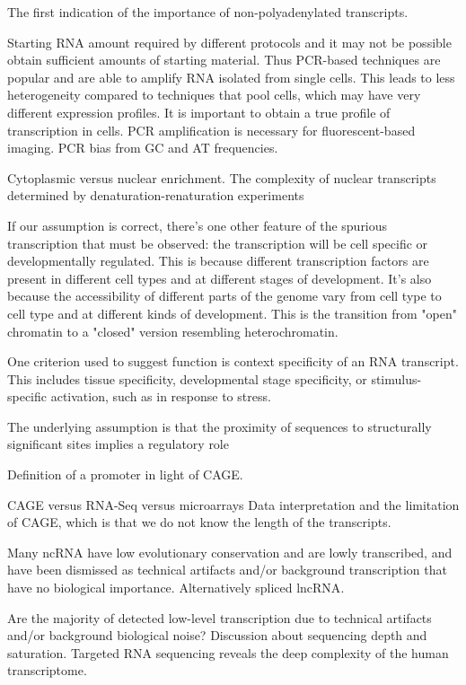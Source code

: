 The first indication of the importance of non-polyadenylated transcripts\cite{pmid4213457}.

Starting RNA amount required by different protocols and it may not be possible obtain sufficient amounts of starting material. Thus PCR-based techniques are popular and are able to amplify RNA isolated from single cells. This leads to less heterogeneity compared to techniques that pool cells, which may have very different expression profiles. It is important to obtain a true profile of transcription in cells. PCR amplification is necessary for fluorescent-based imaging. PCR bias from GC and AT frequencies.

Cytoplasmic versus nuclear enrichment. The complexity of nuclear transcripts determined by denaturation-renaturation experiments\cite{pmid5969070}

If our assumption is correct, there's one other feature of the spurious transcription that must be observed: the transcription will be cell specific or developmentally regulated. This is because different transcription factors are present in different cell types and at different stages of development. It's also because the accessibility of different parts of the genome vary from cell type to cell type and at different kinds of development. This is the transition from "open" chromatin to a "closed" version resembling heterochromatin.

One criterion used to suggest function is context specificity of an RNA transcript. This includes tissue specificity, developmental stage specificity, or stimulus-specific activation, such as in response to stress.

The underlying assumption is that the proximity of sequences to structurally significant sites implies a regulatory role

Definition of a promoter in light of CAGE.

CAGE versus RNA-Seq versus microarrays\cite{pmid24676093} Data interpretation and the limitation of CAGE, which is that we do not know the length of the transcripts.

Many ncRNA have low evolutionary conservation and are lowly transcribed, and have been dismissed as technical artifacts and/or background transcription that have no biological importance. Alternatively spliced lncRNA\cite{Johnsson2013}.

Are the majority of detected low-level transcription due to technical artifacts and/or background biological noise? Discussion about sequencing depth and saturation. Targeted RNA sequencing reveals the deep complexity of the human transcriptome\cite{pmid22081020}.


